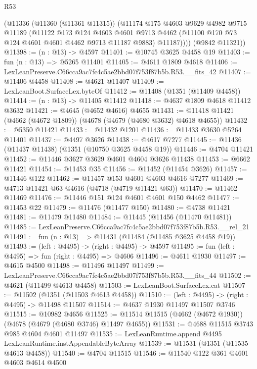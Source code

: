 \begin{lexlean}{R53}
\begin{coremodule}
        (@11336
          (@11360 (@11361 @11315))
          (@11174
            @175
            @4603
            @9629
            @4982
            @9715
            @11189
            (@11122
              @173
              @124
              @4603
              @4601
              @9713
              @4462
              (@11100 @170 @73 @124 @4601 @4601 @4462 @9713 @11187 @9883)
              @11187))))
      (@9842 @11321))
@11398 := (n : @13) -> @4597
@11401 := @10745 @3625 @4458 @19
@11403 := fun (n : @13) => @5265 @11401
@11405 := @4611 @1809 @4618
@11406 := LexLeanPreserve.C66cca9ac7fc4c5ae2bbd07f753f87b5b.R53.__fits_42
@11407 := @11406 @4458
@11408 := @4621 @11407
@11409 := LexLeanBoot.SurfaceLex.byteOf
@11412 := @11408 (@1351 (@11409 @4458))
@11414 := (n : @13) -> @11405 @11412
@11418 := @4637 @1809 @4618 @11412 @3632
@11421 := @4645 (@4652 @4616) @4655
@11431 := @11418 @11421 (@4662 (@4672 @1809)) (@4678 (@4679 (@4680 @3632) @4618 @4655))
@11432 := @5350 @11421
@11433 := @11432 @1201
@11436 := @11433 @3630 @5264 @11401
@11437 := @4497 @3626
@11438 := @4617 @7277
@11445 := @11436 (@11437 @11438) (@1351 (@10750 @3625 @4458 @19))
@11446 := @4704 @11421
@11452 := @11446 @3627 @3629 @4601 @4604 @3626 @11438
@11453 := @6662 @11421
@11454 := @11453 @35
@11456 := @11452 (@11454 @3626)
@11457 := @11446 @122
@11462 := @11457 @153 @4601 @4603 @4616 @7277
@11469 := @4713 @11421 @63 @4616 (@4718 (@4719 @11421 @63))
@11470 := @11462 @11469
@11476 := @11446 @151 @124 @4601 @4601 @150 @4462
@11477 := @11453 @22
@11479 := @11476 (@11477 @150)
@11480 := @4738 @11421
@11481 := @11479 @11480
@11484 := @11445 (@11456 (@11470 @11481))
@11485 := LexLeanPreserve.C66cca9ac7fc4c5ae2bbd07f753f87b5b.R53.__rel_21
@11491 := fun (n : @13) => @11431 (@11484 (@11485 @3625 @4458 @19))
@11493 := (left : @4495) -> (right : @4495) -> @4597
@11495 := fun (left : @4495) => fun (right : @4495) => @4606
@11496 := @4611 @1930
@11497 := @4615 @4500
@11498 := @11496 @11497
@11499 := LexLeanPreserve.C66cca9ac7fc4c5ae2bbd07f753f87b5b.R53.__fits_44
@11502 := @4621 (@11499 @4613 @4458)
@11503 := LexLeanBoot.SurfaceLex.cat
@11507 := @11502 (@1351 (@11503 @4613 @4458))
@11510 := (left : @4495) -> (right : @4495) -> @11498 @11507
@11514 := @4637 @1930 @11497 @11507 @3746
@11515 := @10982 @4656
@11525 := @11514 @11515 (@4662 (@4672 @1930)) (@4678 (@4679 (@4680 @3746) @11497 @4655))
@11531 := @4688 @11515 @3743 @985 @4604 @4601 @11497
@11535 := LexLeanRuntime.append @4495 LexLeanRuntime.instAppendableByteArray
@11539 := @11531 (@1351 (@11535 @4613 @4458))
@11540 := @4704 @11515
@11546 := @11540 @122 @361 @4601 @4603 @4614 @4500

\end{coremodule}
\end{lexlean}
